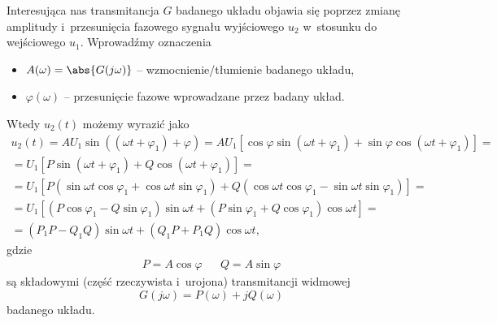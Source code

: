 \documentclass[paper=a4,DIV=12]{tfa}
\begin{document}
Interesująca nas transmitancja $G$ badanego układu objawia się poprzez zmianę
amplitudy i~przesunięcia fazowego sygnału wyjściowego $u_2$ w~stosunku do
wejściowego $u_1$. Wprowadźmy oznaczenia
\begin{itemize}
  \item $A(\omega) = \abs{G(j\omega)}$ -- wzmocnienie/tłumienie badanego układu,
  \item $\varphi(\omega)$ -- przesunięcie fazowe wprowadzane przez badany układ.
\end{itemize}
Wtedy $u_2(t)$ możemy wyrazić jako
\begin{multline}
  u_2(t) = A U_1 \sin{((\omega t + \varphi_1) + \varphi)} = A U_1 \left[
    \cos{\varphi} \sin{(\omega t + \varphi_1)
  + \sin{\varphi} \cos{(\omega t + \varphi_1)}}
  \right] = \\ = U_1 \left[
    P \sin{(\omega t + \varphi_1) + Q \cos{(\omega t + \varphi_1)}}
  \right] = \\ = U_1 \left[
    P \left(
      \sin{\omega t} \cos{\varphi_1}
    + \cos{\omega t} \sin{\varphi_1}
    \right) + Q \left(
      \cos{\omega t} \cos{\varphi_1}
    - \sin{\omega t} \sin{\varphi_1}
    \right)
  \right] = \\ = U_1 \left[
    \left(P \cos{\varphi_1} - Q \sin{\varphi_1}\right)\sin{\omega t}
  + \left(P \sin{\varphi_1} + Q \cos{\varphi_1}\right)\cos{\omega t}
  \right] = \\ =
    \left(P_1 P - Q_1 Q\right) \sin{\omega t}
  + \left(Q_1 P + P_1 Q\right) \cos{\omega t},
  \label{eq:HV0TF}
\end{multline}
gdzie
\begin{align}
  & P = A \cos{\varphi} &
  & Q = A \sin{\varphi} &
  \label{eq:LKWY0}
\end{align}
są składowymi (część rzeczywista i~urojona) transmitancji widmowej
\begin{equation}
  G(j\omega) = P(\omega) + j Q(\omega)
  \label{eq:1RMRC}
\end{equation}
badanego układu.
\end{document}
